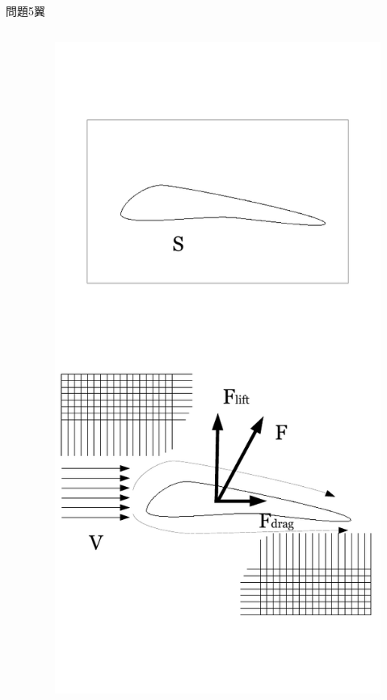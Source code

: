 \documentclass[dvipdfmx]{beamer}
\begin{document}
\begin{frame}{問題5}{翼}
\begin{columns}[t]
\begin{column}{0.7\textwidth}
\end{column}
\begin{column}{0.3\textwidth}
\begin{figure}[htbp]
    \centering
    \includegraphics[bb=0mm 0mm 100.0mm 170.0mm, scale=0.35, type=pdf]{img/problem5.pdf}
\end{figure}
\end{column}
\end{columns}
\end{frame}
\end{document}

